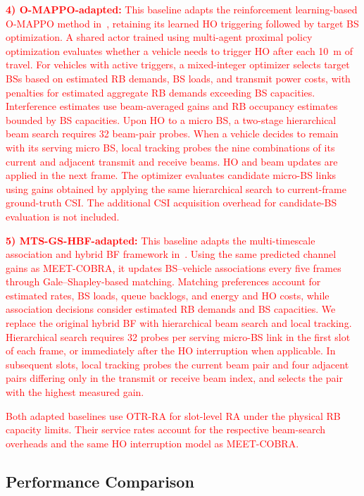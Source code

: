 \documentclass[conference, a4paper]{IEEEtran}
\newcommand{\currentrev}[1]{\textcolor{red}{{}#1}}
\theoremstyle{remark}
\begin{document}
\currentrev{\textbf{4) O-MAPPO-adapted:} This baseline adapts the reinforcement learning-based O-MAPPO method in~\cite{wang2024joint}, retaining its learned HO triggering followed by target BS optimization. A shared actor trained using multi-agent proximal policy optimization evaluates whether a vehicle needs to trigger HO after each 10~m of travel. For vehicles with active triggers, a mixed-integer optimizer selects target BSs based on estimated RB demands, BS loads, and transmit power costs, with penalties for estimated aggregate RB demands exceeding BS capacities. Interference estimates use beam-averaged gains and RB occupancy estimates bounded by BS capacities. Upon HO to a micro BS, a two-stage hierarchical beam search requires 32 beam-pair probes. When a vehicle decides to remain with its serving micro BS, local tracking probes the nine combinations of its current and adjacent transmit and receive beams. HO and beam updates are applied in the next frame. The optimizer evaluates candidate micro-BS links using gains obtained by applying the same hierarchical search to current-frame ground-truth CSI. The additional CSI acquisition overhead for candidate-BS evaluation is not included.}

\currentrev{\textbf{5) MTS-GS-HBF-adapted:} This baseline adapts the multi-timescale association and hybrid BF framework in~\cite{heydarian2025multitimescale}. Using the same predicted channel gains as MEET-COBRA, it updates BS--vehicle associations every five frames through Gale--Shapley-based matching. Matching preferences account for estimated rates, BS loads, queue backlogs, and energy and HO costs, while association decisions consider estimated RB demands and BS capacities. We replace the original hybrid BF with hierarchical beam search and local tracking. Hierarchical search requires 32 probes per serving micro-BS link in the first slot of each frame, or immediately after the HO interruption when applicable. In subsequent slots, local tracking probes the current beam pair and four adjacent pairs differing only in the transmit or receive beam index, and selects the pair with the highest measured gain.}

\currentrev{Both adapted baselines use OTR-RA for slot-level RA under the physical RB capacity limits. Their service rates account for the respective beam-search overheads and the same HO interruption model as MEET-COBRA.}

\subsection{Performance Comparison}
\end{document}
